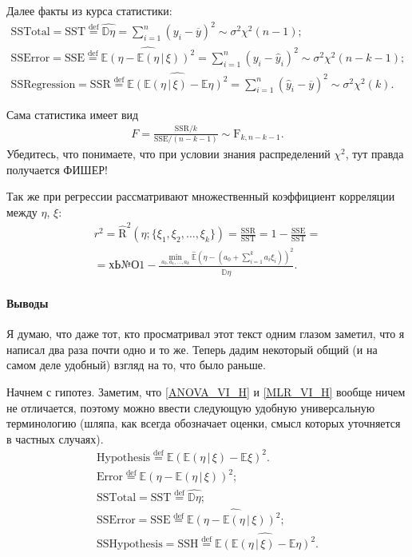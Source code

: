 Далее факты из курса статистики:
\begin{gather*}
    \mathrm {SS Total} = \mathrm {SST} \overset{\mathrm{def}}{=} \widehat{\mathbb D \eta} = \sum_{i=1}^n (y_i - \overline y)^2 \sim \mathcal \sigma^2 \chi^2 (n - 1);\\
    \mathrm {SS Error} = \mathrm {SSE} \overset{\mathrm{def}}{=} \widehat{\mathbb E(\eta - \mathbb E(\eta\, | \, \xi))^2} = \sum_{i=1}^n (y_{i} - \hat y_i)^2 \sim \sigma^2 \mathcal \chi^2 (n - k - 1);\\
    \mathrm {SS Regression} = \mathrm {SSR} \overset{\mathrm{def}}{=} \widehat{\mathbb E(\mathbb E(\eta\, | \, \xi) - \mathbb E \eta)^2} = \sum_{i=1}^n (\hat y_i - \overline y)^2 \sim \sigma^2 \mathcal \chi^2 (k).
\end{gather*}

Сама статистика имеет вид
\begin{gather*}
    F = \frac{\mathrm{SSR} / k}{\mathrm{SSE} / (n - k - 1)} \sim \mathrm F_{k,n-k-1}.
\end{gather*}
Убедитесь, что понимаете, что при условии знания распределений $\chi^2$, тут правда получается ФИШЕР!

Так же при регрессии рассматривают множественный коэффициент корреляции между $\eta$, $\xi$:
\begin{gather}
    \nonumber
    r^2 = \hat {\mathrm R}^2(\eta; \{\xi_1, \xi_2, \ldots, \xi_k\}) = \mathrm{\frac{SSR}{SST}} = 1 - \mathrm{\frac{SSE}{SST}} = \\ =
    \label{MLR_coef_cor}
    хЬ№О1 - \frac{\min_{a_0, a_1, \ldots, a_k} \hat {\mathbb E}(\eta - (a_0 + \sum_{i=1}^k a_i \xi_i))^2}{\widehat {\mathbb D} \eta}.
\end{gather}

\paragraph{Выводы}
Я думаю, что даже тот, кто просматривал этот текст одним глазом заметил, что я написал два раза почти одно и то же.
Теперь дадим некоторый общий (и на самом деле удобный) взгляд на то, что было раньше.

Начнем с гипотез. Заметим, что \eqref{ANOVA_VI_H} и \eqref{MLR_VI_H} вообще ничем не отличается, поэтому можно ввести следующую удобную универсальную терминологию (шляпа, как всегда обозначает оценки, смысл которых уточняется в частных случаях).
\begin{gather*}
    \mathrm {Hypothesis} \overset{\mathrm{def}}{=} \mathbb E(\mathbb E(\eta\, | \, \xi) - \mathbb E \xi)^2.\\
    \mathrm {Error} \overset{\mathrm{def}}{=} \mathbb E(\eta - \mathbb E(\eta\, | \, \xi))^2;\\
    \mathrm {SS Total} = \mathrm {SST} \overset{\mathrm{def}}{=} \widehat{\mathbb D \eta};\\
    \mathrm {SS Error} = \mathrm {SSE} \overset{\mathrm{def}}{=} \widehat{\mathbb E(\eta - \mathbb E(\eta\, | \, \xi))^2};\\
    \mathrm {SS Hypothesis} = \mathrm {SSH} \overset{\mathrm{def}}{=} \widehat{\mathbb E(\mathbb E(\eta\, | \, \xi) - \mathbb E \eta)^2}.
\end{gather*}

